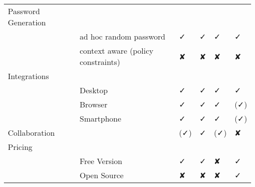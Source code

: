 \begin{table}[tbp]
{\begin{tabular}{rlllll}
	\multicolumn{1}{l}{Password Generation} &       &       &       &       &  \\
	& ad hoc random password & ✓ & ✓ & ✓ & ✓ \\
	& context aware (policy constraints) & ✘ & ✘ & ✘ & ✘ \\
	\multicolumn{1}{l}{Integrations} &       &       &       &       &  \\
	& Desktop  & ✓ & ✓ & ✓ & ✓\\
	& Browser & ✓ & ✓ & ✓ & (✓)\\
	& Smartphone & ✓ & ✓ & ✓ & (✓) \\
	\multicolumn{1}{l}{Collaboration} &       & (✓)   & ✓ & (✓)   & ✘ \\
	\multicolumn{1}{l}{Pricing} &       &       &       &       &  \\
	& Free Version & ✓ & ✓ & ✘ & ✓\\
	& Open Source & ✘ & ✘ & ✘ & ✓\\
\end{tabular}%
}%
\end{table}%
